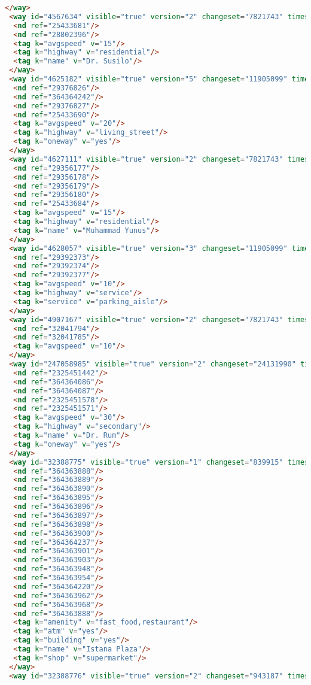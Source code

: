 \begin{lstlisting}[language=HTML,basicstyle=\tiny,caption=bandung1.xml]
 </way>
 <way id="4567634" visible="true" version="2" changeset="7821743" timestamp="2011-04-10T11:15:30Z" user="evo2mind" uid="234610">
  <nd ref="25433681"/>
  <nd ref="28802396"/>
  <tag k="avgspeed" v="15"/>
  <tag k="highway" v="residential"/>
  <tag k="name" v="Dr. Susilo"/>
 </way>
 <way id="4625182" visible="true" version="5" changeset="11905099" timestamp="2012-06-15T14:05:57Z" user="andryono" uid="643030">
  <nd ref="29376826"/>
  <nd ref="364364242"/>
  <nd ref="29376827"/>
  <nd ref="25433690"/>
  <tag k="avgspeed" v="20"/>
  <tag k="highway" v="living_street"/>
  <tag k="oneway" v="yes"/>
 </way>
 <way id="4627111" visible="true" version="2" changeset="7821743" timestamp="2011-04-10T11:15:36Z" user="evo2mind" uid="234610">
  <nd ref="29356177"/>
  <nd ref="29356178"/>
  <nd ref="29356179"/>
  <nd ref="29356180"/>
  <nd ref="25433684"/>
  <tag k="avgspeed" v="15"/>
  <tag k="highway" v="residential"/>
  <tag k="name" v="Muhammad Yunus"/>
 </way>
 <way id="4628057" visible="true" version="3" changeset="11905099" timestamp="2012-06-15T14:05:58Z" user="andryono" uid="643030">
  <nd ref="29392373"/>
  <nd ref="29392374"/>
  <nd ref="29392377"/>
  <tag k="avgspeed" v="10"/>
  <tag k="highway" v="service"/>
  <tag k="service" v="parking_aisle"/>
 </way>
 <way id="4907167" visible="true" version="2" changeset="7821743" timestamp="2011-04-10T11:12:42Z" user="evo2mind" uid="234610">
  <nd ref="32041794"/>
  <nd ref="32041785"/>
  <tag k="avgspeed" v="10"/>
 </way>
 <way id="247058985" visible="true" version="2" changeset="24131990" timestamp="2014-07-14T03:03:33Z" user="brambanan" uid="2092576">
  <nd ref="2325451442"/>
  <nd ref="364364086"/>
  <nd ref="364364087"/>
  <nd ref="2325451578"/>
  <nd ref="2325451571"/>
  <tag k="avgspeed" v="30"/>
  <tag k="highway" v="secondary"/>
  <tag k="name" v="Dr. Rum"/>
  <tag k="oneway" v="yes"/>
 </way>
 <way id="32388775" visible="true" version="1" changeset="839915" timestamp="2009-03-21T14:15:09Z" user="adhitya" uid="7748">
  <nd ref="364363888"/>
  <nd ref="364363889"/>
  <nd ref="364363890"/>
  <nd ref="364363895"/>
  <nd ref="364363896"/>
  <nd ref="364363897"/>
  <nd ref="364363898"/>
  <nd ref="364363900"/>
  <nd ref="364364237"/>
  <nd ref="364363901"/>
  <nd ref="364363903"/>
  <nd ref="364363948"/>
  <nd ref="364363954"/>
  <nd ref="364364220"/>
  <nd ref="364363962"/>
  <nd ref="364363968"/>
  <nd ref="364363888"/>
  <tag k="amenity" v="fast_food,restaurant"/>
  <tag k="atm" v="yes"/>
  <tag k="building" v="yes"/>
  <tag k="name" v="Istana Plaza"/>
  <tag k="shop" v="supermarket"/>
 </way>
 <way id="32388776" visible="true" version="2" changeset="943187" timestamp="2009-04-25T10:24:30Z" user="Andre68" uid="31231">

\end{lstlisting}
